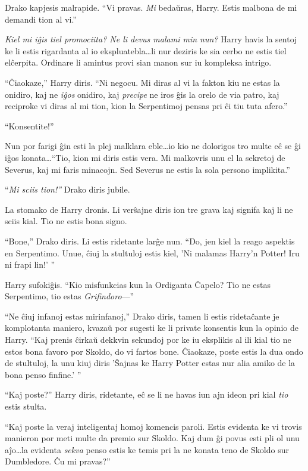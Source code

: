 Drako kapjesis malrapide. ``Vi pravas. \emph{Mi} bedaŭras,
Harry. Estis malbona de mi demandi tion al vi.''

\emph{Kiel mi iĝis tiel promociita? Ne li devus malami min nun?} Harry
havis la sentoj ke li estis rigardanta al io ekspluatebla\ldots li nur
deziris ke sia cerbo ne estis tiel elĉerpita. Ordinare li amintus
provi sian manon sur iu kompleksa intrigo.

``Ĉiaokaze,'' Harry diris. ``Ni negocu. Mi diras al vi la fakton kiu
ne estas la onidiro, kaj ne \emph{iĝos} onidiro, kaj \emph{precipe} ne
iros ĝis la orelo de via patro, kaj reciproke vi diras al mi tion,
kion la Serpentimoj pensas pri ĉi tiu tuta afero.''

``Konsentite!''

Nun por farigi ĝin esti la plej malklara eble\ldots io kio ne
dolorigos tro multe eĉ se ĝi iĝos konata\ldots ``Tio, kion mi diris
estis vera. Mi malkovris unu el la sekretoj de Severus, kaj mi faris
minacojn. Sed Severus ne estis la sola persono implikita.''

``\emph{Mi sciis tion!''} Drako diris jubile.

La stomako de Harry dronis. Li verŝajne diris ion tre grava kaj
signifa kaj li ne sciis kial. Tio ne estis bona signo.

``Bone,'' Drako diris. Li estis ridetante larĝe nun. ``Do, jen kiel la
reago aspektis en Serpentimo. Unue, ĉiuj la stultuloj estis kiel, 'Ni
malamas Harry'n Potter! Iru ni frapi lin!' ''

Harry sufokiĝis. ``Kio misfunkcias kun la Ordiganta Ĉapelo? Tio ne
estas Serpentimo, tio estas \emph{Grifindoro}—''

``Ne ĉiuj infanoj estas mirinfanoj,'' Drako diris, tamen li estis
ridetaĉante je komplotanta maniero, kvazaŭ por sugesti ke li private
konsentis kun la opinio de Harry. ``Kaj prenis ĉirkaŭ dekkvin sekundoj
por ke iu eksplikis al ili kial tio ne estos bona favoro por Skoldo,
do vi fartos bone. Ĉiaokaze, poste estis la dua ondo de stultuloj,
la unu kiuj diris 'Ŝajnas ke Harry Potter estas nur alia amiko de la
bona penso finfine.' ''

``Kaj poste?'' Harry diris, ridetante, eĉ se li ne havas iun ajn ideon
pri kial \emph{tio} estis stulta.

``Kaj poste la veraj inteligentaj homoj komencis paroli. Estis
evidenta ke vi trovis manieron por meti multe da premio sur
Skoldo. Kaj dum ĝi povus esti pli ol unu aĵo\ldots la evidenta
\emph{sekva} penso estis ke temis pri la ne konata teno de Skoldo sur
Dumbledore. Ĉu mi pravas?''

